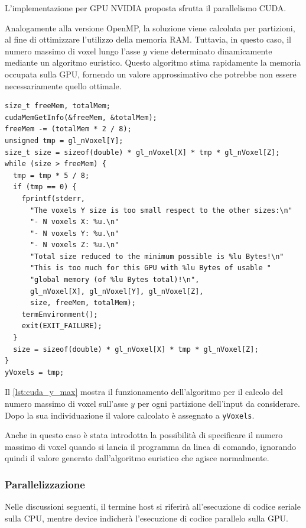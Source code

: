 \documentclass[12pt,a4paper]{report}
\begin{document}
L'implementazione per GPU NVIDIA proposta sfrutta il parallelismo CUDA.

Analogamente alla versione OpenMP, la soluzione viene calcolata per partizioni, al fine di ottimizzare l'utilizzo della memoria
RAM.
Tuttavia, in questo caso, il numero massimo di voxel lungo l'asse \(y\) viene determinato dinamicamente mediante un algoritmo
euristico.
Questo algoritmo stima rapidamente la memoria occupata sulla GPU, fornendo un valore approssimativo che potrebbe non essere
necessariamente quello ottimale.

\begin{lstlisting}[language=CStyle, caption={Codice CUDA-C per il calcolo del numero massimo di voxel sull'asse \(y\).}, label={lst:cuda_y_max}]
size_t freeMem, totalMem;
cudaMemGetInfo(&freeMem, &totalMem);
freeMem -= (totalMem * 2 / 8);
unsigned tmp = gl_nVoxel[Y];
size_t size = sizeof(double) * gl_nVoxel[X] * tmp * gl_nVoxel[Z];
while (size > freeMem) {
  tmp = tmp * 5 / 8;
  if (tmp == 0) {
    fprintf(stderr,
      "The voxels Y size is too small respect to the other sizes:\n"
      "- N voxels X: %u.\n"
      "- N voxels Y: %u.\n"
      "- N voxels Z: %u.\n"
      "Total size reduced to the minimum possible is %lu Bytes!\n"
      "This is too much for this GPU with %lu Bytes of usable "
      "global memory (of %lu Bytes total)!\n",
      gl_nVoxel[X], gl_nVoxel[Y], gl_nVoxel[Z],
      size, freeMem, totalMem);
    termEnvironment();
    exit(EXIT_FAILURE);
  }
  size = sizeof(double) * gl_nVoxel[X] * tmp * gl_nVoxel[Z];
}
yVoxels = tmp;
\end{lstlisting}

Il \autoref{lst:cuda_y_max} mostra il funzionamento dell'algoritmo per il calcolo del numero massimo di voxel sull'asse \(y\) per
ogni partizione dell'input da considerare.
Dopo la sua individuazione il valore calcolato è assegnato a \mbox{\lstinline{yVoxels}.}

Anche in questo caso è stata introdotta la possibilità di specificare il numero massimo di voxel quando si lancia il programma da
linea di comando, ignorando quindi il valore generato dall'algoritmo euristico che agisce normalmente.

\subsubsection{Parallelizzazione}

Nelle discussioni seguenti, il termine host si riferirà all'esecuzione di codice seriale sulla CPU, mentre device indicherà
l'esecuzione di codice parallelo sulla GPU.
\end{document}
